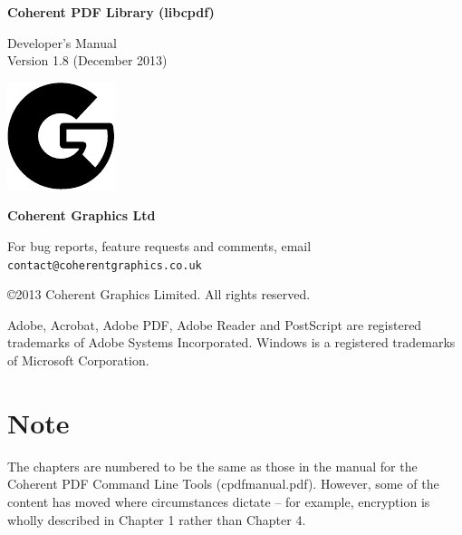 \documentclass[a4paper]{memoir}
\newcommand{\smallgap}{\vspace{4mm}}
\begin{document}
\frontmatter
\thispagestyle{empty}

\begin{flushright}

{\sffamily \bfseries \Huge Coherent PDF Library (libcpdf)}

\vspace{12mm}

{\Huge Developer's Manual}\\\vspace{2mm}
Version 1.8 (December 2013)

\vspace{25mm}

\vfill

\includegraphics{logo.pdf}

\vspace{2mm}
{\sffamily \bfseries \LARGE Coherent Graphics Ltd}

\end{flushright}

\clearpage

\thispagestyle{empty}
\noindent For bug reports, feature requests and comments, email\\ \texttt{contact@coherentgraphics.co.uk}

\vspace*{\fill}
\noindent\copyright 2013 Coherent Graphics Limited. All rights reserved.

\smallgap 
\noindent Adobe, Acrobat, Adobe PDF, Adobe Reader and PostScript are
registered trademarks of Adobe Systems Incorporated. Windows is a registered trademarks of Microsoft Corporation.

\cleardoublepage
\tableofcontents

\cleardoublepage
\mainmatter
{}
\pagestyle{ruled}

\chapter*{Note}

The chapters are numbered to be the same as those in the manual for the Coherent PDF Command Line Tools (cpdfmanual.pdf). However, some of the content has moved where circumstances dictate -- for example, encryption is wholly described in Chapter 1 rather than Chapter 4.
\end{document}
